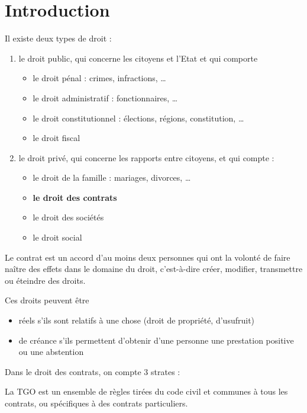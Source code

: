 \chapter{Introduction}

Il existe deux types de droit :

\begin{enumerate}
	\item le droit public, qui concerne les citoyens et l'Etat et qui comporte
	
	\begin{itemize}
		\item le droit pénal : crimes, infractions, \dots
		\item le droit administratif : fonctionnaires, \dots
		\item le droit constitutionnel : élections, régions, constitution, \dots
		\item le droit fiscal
	\end{itemize}
	
	\item le droit privé, qui concerne les rapports entre citoyens, et qui compte :
	
	\begin{itemize}
		\item le droit de la famille : mariages, divorces, \dots
		\item \textbf{le droit des contrats}
		\item le droit des sociétés
		\item le droit social
	\end{itemize}
\end{enumerate}

Le contrat est un accord d'au moins deux personnes qui ont la volonté de faire naître des effets dans le domaine du droit, c'est-à-dire créer, modifier, transmettre ou éteindre des droits.

Ces droits peuvent être

\begin{itemize}
	\item réels s'ils sont relatifs à une chose (droit de propriété, d'usufruit)
	\item de créance s'ils permettent d'obtenir d'une personne une prestation positive ou une abstention
\end{itemize}

Dans le droit des contrats, on compte 3 strates :


La TGO est un ensemble de règles tirées du code civil et communes à tous les contrats, ou spécifiques à des contrats particuliers.